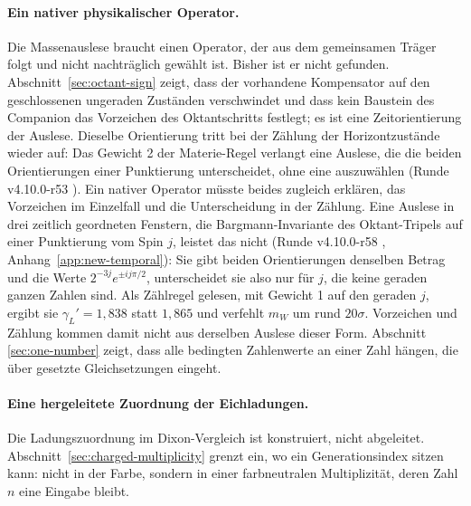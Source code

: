 \paragraph{Ein nativer physikalischer Operator.}
Die Massenauslese braucht einen Operator, der aus dem gemeinsamen Träger folgt und nicht nachträglich gewählt ist. Bisher ist er nicht
gefunden. Abschnitt~\ref{sec:octant-sign} zeigt, dass der vorhandene Kompensator auf den geschlossenen ungeraden Zuständen verschwindet
und dass kein Baustein des Companion das Vorzeichen des Oktantschritts festlegt; es ist eine Zeitorientierung der Auslese. Dieselbe
Orientierung tritt bei der Zählung der Horizontzustände wieder auf: Das Gewicht 2 der Materie-Regel verlangt eine Auslese, die die beiden
Orientierungen einer Punktierung unterscheidet, ohne eine auszuwählen (Runde v4.10.0-r53 \cite{layers}). Ein nativer Operator müsste beides zugleich
erklären, das Vorzeichen im Einzelfall und die Unterscheidung in der Zählung. Eine Auslese in drei zeitlich geordneten Fenstern, die
Bargmann-Invariante des Oktant-Tripels auf einer Punktierung vom Spin \(j\), leistet das nicht (Runde v4.10.0-r58 \cite{layers}, Anhang~\ref{app:new-temporal}):
Sie gibt beiden Orientierungen denselben Betrag und die Werte \(2^{-3j}e^{\pm ij\pi/2}\), unterscheidet sie also nur für \(j\), die keine geraden
ganzen Zahlen sind. Als Zählregel gelesen, mit Gewicht 1 auf den geraden \(j\), ergibt sie \(\gamma_L'=1{,}838\) statt \(1{,}865\) und verfehlt
\(m_W\) um rund \(20\sigma\). Vorzeichen und Zählung kommen damit nicht aus derselben Auslese dieser Form. Abschnitt
\ref{sec:one-number} zeigt, dass alle bedingten Zahlenwerte an einer Zahl hängen, die über gesetzte Gleichsetzungen eingeht.

\paragraph{Eine hergeleitete Zuordnung der Eichladungen.}
Die Ladungszuordnung im Dixon-Vergleich ist konstruiert, nicht abgeleitet. Abschnitt~\ref{sec:charged-multiplicity} grenzt ein, wo ein
Generationsindex sitzen kann: nicht in der Farbe, sondern in einer farbneutralen Multiplizität, deren Zahl \(n\) eine Eingabe bleibt.

